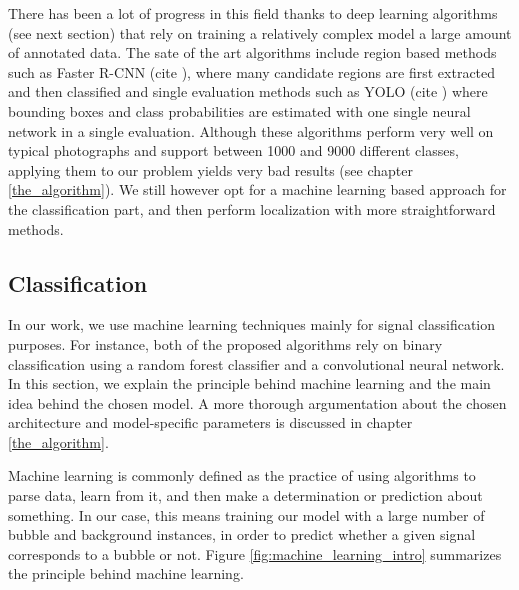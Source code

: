 	There has been a lot of progress in this field thanks to deep learning algorithms (see next section) that rely on training a relatively complex model a large amount of annotated data. The sate of the art algorithms include region based methods such as Faster R-CNN (cite \cite{faster_rcnn}), where many candidate regions are first extracted and then classified and single evaluation methods such as YOLO (cite \cite{YOLO}) where bounding boxes and class probabilities are estimated with one single neural network in a single evaluation. Although these algorithms perform very well on typical photographs and support between 1000 and 9000 different classes, applying them to our problem yields very bad results (see chapter \ref{the_algorithm}). We still however opt for a machine learning based approach for the classification part, and then perform localization with more straightforward methods.
		
		\subsection{Classification}\label{machine_learning}
		In our work, we use machine learning techniques mainly for signal classification purposes. For instance, both of the proposed algorithms rely on binary classification using a random forest classifier and a convolutional neural network. In this section, we explain the principle behind machine learning and the main idea behind the chosen model. A more thorough argumentation about the chosen architecture and model-specific parameters is discussed in chapter \ref{the_algorithm}.

		Machine learning is commonly defined as the practice of using algorithms to parse data, learn from it, and then make a determination or prediction about something. In our case, this means training our model with a large number of bubble and background instances, in order to predict whether a given signal corresponds to a bubble or not. Figure \ref{fig:machine_learning_intro} summarizes the principle behind machine learning. 
		
